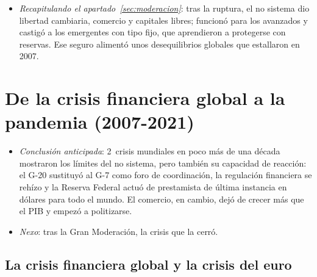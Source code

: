 \documentclass[11pt]{article}
\begin{document}
\begin{itemize}
\item \emph{Recapitulando el apartado~\ref{sec:moderacion}}: tras la ruptura, el no sistema dio libertad cambiaria, comercio y capitales libres; funcionó para los avanzados y castigó a los emergentes con tipo fijo, que aprendieron a protegerse con reservas. Ese seguro alimentó unos desequilibrios globales que estallaron en 2007.
\end{itemize}

\section{De la crisis financiera global a la pandemia (2007-2021)}\label{sec:crisis}

\begin{itemize}
\item \emph{Conclusión anticipada}: 2~crisis mundiales en poco más de una década mostraron los límites del no sistema, pero también su capacidad de reacción: el G-20 sustituyó al G-7 como foro de coordinación, la regulación financiera se rehízo y la Reserva Federal actuó de prestamista de última instancia en dólares para todo el mundo. El comercio, en cambio, dejó de crecer más que el PIB y empezó a politizarse.
\item \emph{Nexo}: tras la Gran Moderación, la crisis que la cerró.
\end{itemize}

\subsection{La crisis financiera global y la crisis del euro}\label{sec:cfg}
\end{document}
